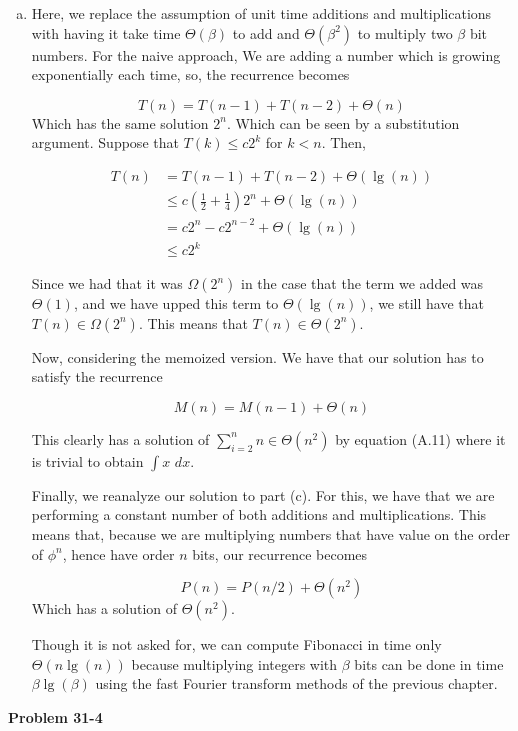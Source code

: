 \documentclass{article}
\begin{document}
\begin{enumerate}[a.]
\item
Here, we replace the assumption of unit time additions and multiplications with having it take time $\Theta(\beta)$ to add and $\Theta(\beta^2)$ to multiply two $\beta$ bit numbers. For the naive approach, We are adding a number which is growing exponentially each time, so, the recurrence becomes 

\[
T(n) = T(n-1) + T(n-2) + \Theta(n)
\]
Which has the same solution $2^n$. Which can be seen by a substitution argument. Suppose that $T(k) \le c 2^k$ for $k<n$. Then,

\begin{align*}
T(n) &= T(n-1) +T(n-2) + \Theta(\lg(n))\\
&\le c(\frac{1}{2} + \frac{1}{4})2^n + \Theta(\lg(n))\\
&= c2^n - c2^{n-2} + \Theta(\lg(n))\\
&\le c2^k
\end{align*}

Since we had that it was $\Omega(2^n)$ in the case that the term we added was $\Theta(1)$, and we have upped this term to $\Theta(\lg(n))$, we still have that $T(n)\in \Omega(2^n)$. This means that $T(n) \in \Theta(2^n)$.


Now, considering the memoized version. We have that our solution has to satisfy the recurrence

\[
M(n) = M(n-1) + \Theta(n)
\]

This clearly has a solution of $\sum_{i=2}^n n \in\Theta(n^2)$ by equation (A.11) where it is trivial to obtain $\int x\,\,dx$. 

Finally, we reanalyze our solution to part (c). For this, we have that we are performing a constant number of both additions and multiplications. This means that, because we are multiplying numbers that have value on the order of $\phi^n$, hence have order $n$ bits,  our recurrence becomes

\[
P(n) = P(n/2) + \Theta(n^2)
\]
Which has a solution of $\Theta(n^2)$.


Though it is not asked for, we can compute Fibonacci in time only $\Theta(n\lg(n))$ because multiplying integers with $\beta$ bits can be done in time $\beta\lg(\beta)$ using the fast Fourier transform methods of the previous chapter.

\end{enumerate}

\noindent\textbf{Problem 31-4}\\
\end{document}

